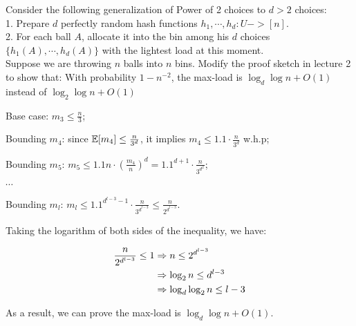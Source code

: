 \begin{problem}[20 points]
Consider the following generalization of Power of 2 choices to $d > 2$ choices: \\
1. Prepare $d$ perfectly random hash functions $h_1, \cdots, h_d : U -> [n]$. \\
2. For each ball $A$, allocate it into the bin among his $d$ choices $\{h_1(A), \cdots, h_d(A)\}$ with the lightest load at this moment. \\

Suppose we are throwing $n$ balls into $n$ bins. Modify the proof sketch in lecture 2 to show that: With probability $1 - n^{-2}$, 
the max-load is $\log_d{\log n} + O(1)$ instead of $\log_2{\log n} + O(1)$

\Answer

Base case: $m_3 \le \frac{n}{3}$;

Bounding $m_4$: since $\operatorname*{\mathbb{E}}[m_4] \le \frac{n}{3^d}$, it implies $m_4 \le 1.1 \cdot \frac{n}{3^d}$ w.h.p;

Bounding $m_5$: $m_5 \le 1.1n \cdot (\frac{m_4}{n})^d = 1.1^{d+1} \cdot \frac{n}{3^{d^2}}$;

$\cdots$

Bounding $m_l$: $m_l \le 1.1^{d^{l-3}-1} \cdot \frac{n}{3^{d^{l-3}}} \le \frac{n}{2^{d^{l-3}}}$.

Taking the logarithm of both sides of the inequality, we have:

\begin{align}
    \notag \frac{n}{2^{d^{l-3}}} \le 1  & \Rightarrow n \le 2^{d^{l-3}} \\
    \notag & \Rightarrow  \log_2 n \le d^{l-3} \\
    & \Rightarrow \log_d{\log_2 n} \le l-3
\end{align}

As a result, we can prove the max-load is $\log_d{\log n} + O(1)$.

\end{problem}


